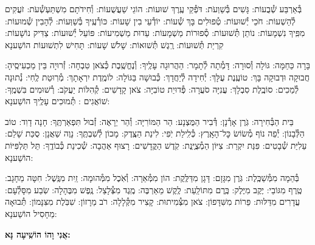 \documentclass[twoside, openany, parskip=half, 11pt]{book}
\begin{document}
בְּ֯אַרְבַּע שְׁ֯בֻעוֹת: גָּשִׁים בְּ֯שַׁוְעֹת: דֹּפְ֯קֵי עֶֽרֶךְ שׁוּעוֹת: הוֹגֵי שַׁעֲשֻׁעוֹת: וְ֯חִידֹתָם מִשְׁתַּעְשְׁ֯עֹת: זֹעֲקִים לְ֯הַשְׁעוֹת: חֹכֵי יְ֯שׁוּעוֹת: טְ֯פוּלִים בָּךְ שְׁ֯עוֹת: יוֹדְ֯עֵי בִין שָׁעוֹת: כּוֹרְ֯עֶֽיךָ בְּ֯שַׁוְּעוֹת: לְ֯הָבִין שְׁ֯מוּעוֹת: מִפִּֽיךָ נִשְׁמָעוֹת: נוֹתֵן תְּ֯שׁוּעוֹת: סְ֯פוּרוֹת מַשְׁמָעוֹת: עֵדוּת מַשְׁמִיעוֹת: פּוֹעֵל יְ֯שׁוּעוֹת: צַדִּיק נוֹשָׁעוֹת: קִרְיַת תְּ֯שׁוּעוֹת: רֶֽגֶשׁ תְּ֯שׁוּאוֹת:
שָׁלֹשׁ שָׁעוֹת:
תָּחִישׁ לִתְשׁוּעוֹת הוֹשַׁענָא



בָּרָה כַּחַמָּה: גּוֹלָה וְ֯סוּרָה: דָּמְ֯תָה לְ֯תָמָר: הַהֲרוּגָה עָלֶֽיךָ: וְ֯נֶחֱשֶֽׁבֶת כְּ֯צֹאן טִבְחָה: זְ֯רוּיָה בֵּין מַכְעִיסֶֽיהָ: חֲבוּקָה וּדְבוּקָה בָּךְ: טוֹעֶֽנֶת עֻלָּךְ: יְ֯חִידָה לְ֯יַחֲדָךְ: כְּ֯בוּשָׁה בַּגּוֹלָה: לוֹמֶֽדֶת יִרְאָתָךְ: מְ֯רֽוּטַת לֶֽחִי: נְ֯תוּנָה לְ֯מַכִים: סוֹבֶֽלֶת סִבְלָךְ: עֲנִיָּה סֹעֲרָה: פְּ֯דוּיַת טוֹבִיָּה: צֹאן קָדָשִׁים: קְ֯הִלּוֹת יַעֲקֹב: רְ֯שׁוּמִים בִּשְׁמֶֽךָ:
שׁוֹאֲגִים :
תְּ֯מוּכִים עָלֶֽיךָ הוֹשַׁענָא:


בֵּית הַבְּ֯חִירָה: גֹּֽרֶן אָרְ֯נָן: דְּ֯בִיר הַמֻּצְנָע: הַר הַמּוֹרִיָּה: וְ֯הַר יֵרָאֶה: זְ֯בוּל תִּפְאַרְתֶּֽךָ: חָנָה דָוִד: טוֹב הַלְּ֯בָנוֹן: יְ֯פֵה נוֹף מְ֯שׂוֹשׂ כׇּל־הָאָֽרֶץ: כְּ֯לִֽילַת יֹֽפִי: לִינַת הַצֶּֽדֶק: מָכוֹן לְ֯שִׁבְתֶּֽךָ: נָוֶה שַׁאֲנָן: סֻכַּת שָׁלֵם: עַלִיַּת שְׁ֯בָטִים: פִּנַּת יִקְרַת: צִיּוֹן הַמְ֯צֻיֶּֽנֶת: קֹֽדֶשׁ הַקֳּדָשִׁים: רָצוּף אַהֲבָה:
שְׁ֯כִינַת כְּ֯בוֹדֶֽךָ:
תֵּל תַּלְפִּיּוֹת הוֹשַׁענָא:


בְּ֯הֵמָה מִמְּ֯שַׁכֶּֽלֶת: גֹּֽרֶן מִגָּזָם: דָּגָן מִדַּלֶּֽקֶת: הוֹן מִמְּ֯אֵרָה: וְ֯אֹֽכֶל מִמְּ֯הוּמָה: זַֽיִת מִנֶּֽשֶׁל: חִטָּה מֵחָגָב: טֶֽרֶף מִגּוֹבַי: יֶקֶב מִיֶּלֶק: כֶּֽרֶם מִתּוֹלַֽעַת: לֶֽקֶשׁ מֵאַרְבֶּה: מֶֽגֶד מִצְּ֯לָצַל: נֶֽפֶשׁ מִבֶּהָלָה: שֽׂבַע מִסָּלְ֯עָם: עֲדָרִים מִדַּלּוּת: פֵּרוֹת מִשִּׁדָּפוֹן: צֹאן מִצְּ֯מִיתוּת: קָצִיר מִקְּ֯לָלָה: רֹב מֵרָזוֹן:
שִׁבֹּֽלֶת מִצִּנָּמוֹן:
תְּ֯בוּאָה מֵחָסִיל הוֹשַׁענָא:


\label{ani vho}
\begin{large}
\textbf{אֲנִי וָהוֹ הוֹשִֽׁיעָה נָּא:}
\end{large}
\end{document}
